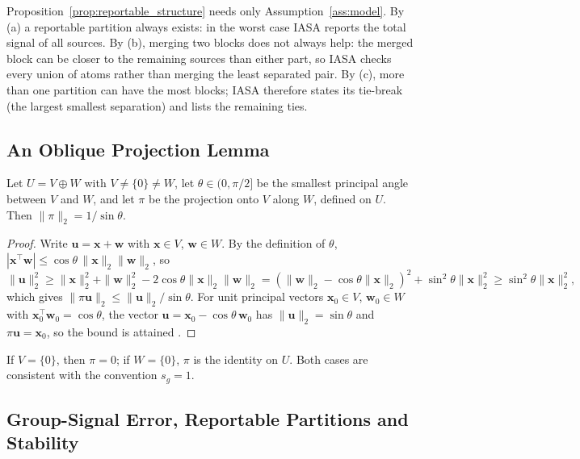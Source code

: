 \begin{remark}[Implication]
Proposition~\ref{prop:reportable_structure} needs only Assumption~\ref{ass:model}.  By
(a) a reportable partition always exists: in the worst case IASA reports the total
signal of all sources.  By (b), merging two blocks does not always help: the merged
block can be closer to the remaining sources than either part, so IASA checks every
union of atoms rather than merging the least separated pair.  By (c), more than one
partition can have the most blocks; IASA therefore states its tie-break (the largest
smallest separation) and lists the remaining ties.
\end{remark}

\subsection{An Oblique Projection Lemma}

\begin{lemma}
\label{lem:oblique}
Let \(U=V\oplus W\) with \(V\ne\{0\}\ne W\), let \(\theta\in(0,\pi/2]\) be the smallest
principal angle between \(V\) and \(W\), and let \(\pi\) be the projection onto
\(V\) along \(W\), defined on \(U\).  Then \(\|\pi\|_2=1/\sin\theta\).
\end{lemma}

\begin{proof}
Write \(\mathbf u=\mathbf x+\mathbf w\) with \(\mathbf x\in V\), \(\mathbf w\in W\).
By the definition of \(\theta\),
\(|\mathbf x^\top\mathbf w|\le\cos\theta\,\|\mathbf x\|_2\|\mathbf w\|_2\), so
\[
\|\mathbf u\|_2^2\ge\|\mathbf x\|_2^2+\|\mathbf w\|_2^2
-2\cos\theta\|\mathbf x\|_2\|\mathbf w\|_2
=(\|\mathbf w\|_2-\cos\theta\|\mathbf x\|_2)^2+\sin^2\theta\|\mathbf x\|_2^2
\ge\sin^2\theta\|\mathbf x\|_2^2 ,
\]
which gives \(\|\pi\mathbf u\|_2\le\|\mathbf u\|_2/\sin\theta\).  For unit principal
vectors \(\mathbf x_0\in V\), \(\mathbf w_0\in W\) with
\(\mathbf x_0^\top\mathbf w_0=\cos\theta\), the vector
\(\mathbf u=\mathbf x_0-\cos\theta\,\mathbf w_0\) has \(\|\mathbf u\|_2=\sin\theta\)
and \(\pi\mathbf u=\mathbf x_0\), so the bound is attained
\citep{ipsen1995angle}.
\end{proof}

If \(V=\{0\}\), then \(\pi=0\); if \(W=\{0\}\), \(\pi\) is the identity on \(U\).  Both
cases are consistent with the convention \(s_g=1\).

\subsection{Group-Signal Error, Reportable Partitions and Stability}

